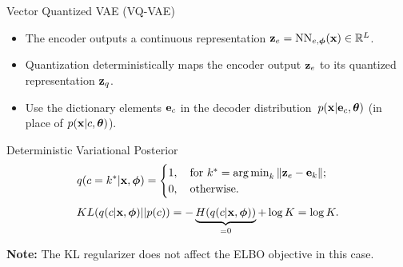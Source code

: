 \documentclass{beamer}
\begin{document}
\begin{frame}{Vector Quantized VAE (VQ-VAE)}
	\begin{itemize}
		\item The encoder outputs a continuous representation $\mathbf{z}_e = \text{NN}_{e, \boldsymbol{\phi}}(\mathbf{x}) \in \mathbb{R}^{L}$.
		\item Quantization deterministically maps the encoder output $\mathbf{z}_e$ to its quantized representation $\mathbf{z}_q$.
		\item Use the dictionary elements $\mathbf{e}_c$ in the decoder distribution~$p(\mathbf{x} | \mathbf{e}_c, \boldsymbol{\theta})$ (in place of $p(\mathbf{x} | c, \boldsymbol{\theta})$).
	\end{itemize}
	\begin{block}{Deterministic Variational Posterior}
		\vspace{-0.3cm}
		\[
			q(c = k^* | \mathbf{x}, \boldsymbol{\phi}) = \begin{cases}
				1 , \quad \text{for } k^* = \operatorname*{arg\,min}_k \| \mathbf{z}_e - \mathbf{e}_k \|; \\
				0, \quad \text{otherwise}.
		\end{cases}
		\]
		\[
			KL(q(c | \mathbf{x}, \boldsymbol{\phi}) || p(c)) = - \underbrace{H(q(c | \mathbf{x}, \boldsymbol{\phi}))}_{=0} + \log K = \log K. 
		\]
	\end{block}	
	\vspace{-0.4cm}
	\textbf{Note:} The KL regularizer does not affect the ELBO objective in this case.
\end{frame}
\end{document}

